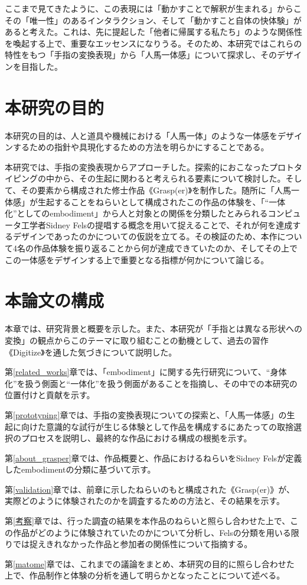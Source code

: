 ここまで見てきたように、この表現には「動かすことで解釈が生まれる」からこその「唯一性」のあるインタラクション、そして「動かすこと自体の快体験」があると考えた。これは、先に提起した「他者に帰属する私たち」のような関係性を喚起する上で、重要なエッセンスになりうる。そのため、本研究ではこれらの特性をもつ「手指の変換表現」から「人馬一体感」について探求し、そのデザインを目指した。

\section{本研究の目的}

本研究の目的は、人と道具や機械における「人馬一体」のような一体感をデザインするための指針や具現化するための方法を明らかにすることである。

本研究では、手指の変換表現からアプローチした。探索的におこなったプロトタイピングの中から、その生起に関わると考えられる要素について検討した。そして、その要素から構成された修士作品《Grasp(er)》を制作した。随所に「人馬一体感」が生起することをねらいとして構成されたこの作品の体験を、「``一体化''としてのembodiment」から人と対象との関係を分類したとみられるコンピュータ工学者Sidney Felsの提唱する概念を用いて捉えることで、それが何を達成するデザインであったのかについての仮説を立てる。その検証のため、本作について4名の作品体験を振り返ることから何が達成できていたのか、そしてその上でこの一体感をデザインする上で重要となる指標が何かについて論じる。

\section{本論文の構成}
本章では、研究背景と概要を示した。また、本研究が「手指とは異なる形状への変換」の観点からこのテーマに取り組むことの動機として、過去の習作《Digitize》を通した気づきについて説明した。

第\ref{related_works}章では、「embodiment」に関する先行研究について、``身体化''を扱う側面と``一体化''を扱う側面があることを指摘し、その中での本研究の位置付けと貢献を示す。

第\ref{prototyping}章では、手指の変換表現についての探索と、「人馬一体感」の生起に向けた意識的な試行が生じる体験として作品を構成するにあたっての取捨選択のプロセスを説明し、最終的な作品における構成の根拠を示す。

第\ref{about_grasper}章では、作品概要と、作品におけるねらいをSidney Felsが定義したembodimentの分類に基づいて示す。

第\ref{validation}章では、前章に示したねらいのもと構成された《Grasp(er)》が、実際どのように体験されたのかを調査するための方法と、その結果を示す。

第\ref{考察}章では、行った調査の結果を本作品のねらいと照らし合わせた上で、この作品がどのように体験されていたのかについて分析し、Felsの分類を用いる限りでは捉えきれなかった作品と参加者の関係性について指摘する。

第\ref{matome}章では、これまでの議論をまとめ、本研究の目的に照らし合わせた上で、作品制作と体験の分析を通して明らかとなったことについて述べる。